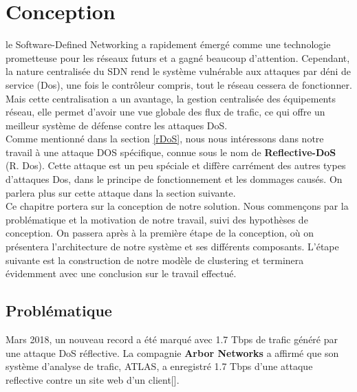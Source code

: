 \chapter{Conception}

\label{Chapter4} 
le Software-Defined Networking a rapidement émergé comme une technologie prometteuse pour les réseaux futurs et a gagné beaucoup d'attention. Cependant, la nature centralisée du SDN rend le système vulnérable aux attaques par déni de service (Dos), une fois le contrôleur compris, tout le réseau cessera de fonctionner. Mais cette centralisation a un avantage, la gestion centralisée des équipements réseau, elle permet d'avoir une vue globale des flux de trafic, ce qui offre un meilleur système de défense contre les attaques DoS.\\

Comme mentionné dans la section \ref{rDoS}, nous nous intéressons dans notre travail à une attaque DOS spécifique, connue sous le nom de \textbf{Reflective-DoS} (R. Dos). Cette attaque est un peu spéciale et diffère carrément des autres types d'attaques Dos, dans le principe de fonctionnement et les dommages causés. On parlera plus sur cette attaque dans la section suivante. \\

Ce chapitre portera sur la conception de notre solution. Nous commençons par la problématique et la motivation de notre travail, suivi des hypothèses de conception. On passera après à la première étape de la conception, où on présentera l'architecture de notre système et ses différents composants. L'étape suivante est la construction de notre modèle de clustering  et terminera évidemment avec une conclusion sur le travail effectué.

\section{Problématique}
Mars 2018, un nouveau record a été marqué avec 1.7 Tbps de trafic généré par une attaque DoS réflective. La compagnie \textbf{Arbor Networks} a affirmé que son système d'analyse de trafic, ATLAS, a enregistré 1.7 Tbps d'une attaque reflective contre un site web d'un client[\cite{19}].\\

